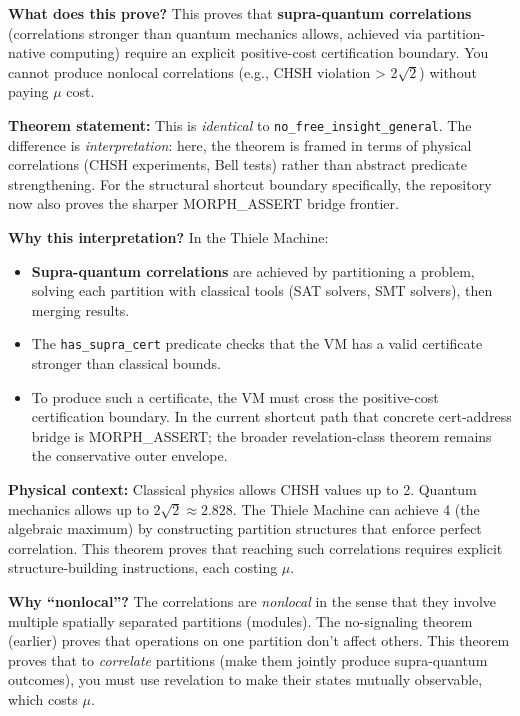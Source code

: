 \textbf{What does this prove?} This proves that \textbf{supra-quantum correlations} (correlations stronger than quantum mechanics allows, achieved via partition-native computing) require an explicit positive-cost certification boundary. You cannot produce nonlocal correlations (e.g., CHSH violation > 2$\sqrt{2}$) without paying $\mu$ cost.

\textbf{Theorem statement:} This is \textit{identical} to \texttt{no\_free\_insight\_general}. The difference is \textit{interpretation}: here, the theorem is framed in terms of physical correlations (CHSH experiments, Bell tests) rather than abstract predicate strengthening. For the structural shortcut boundary specifically, the repository now also proves the sharper MORPH\_ASSERT bridge frontier.

\textbf{Why this interpretation?} In the Thiele Machine:
\begin{itemize}
    \item \textbf{Supra-quantum correlations} are achieved by partitioning a problem, solving each partition with classical tools (SAT solvers, SMT solvers), then merging results.
    \item The \texttt{has\_supra\_cert} predicate checks that the VM has a valid certificate stronger than classical bounds.
    \item To produce such a certificate, the VM must cross the positive-cost certification boundary. In the current shortcut path that concrete cert-address bridge is MORPH\_ASSERT; the broader revelation-class theorem remains the conservative outer envelope.
\end{itemize}

\textbf{Physical context:} Classical physics allows CHSH values up to 2. Quantum mechanics allows up to $2\sqrt{2} \approx 2.828$. The Thiele Machine can achieve 4 (the algebraic maximum) by constructing partition structures that enforce perfect correlation. This theorem proves that reaching such correlations requires explicit structure-building instructions, each costing $\mu$.

\textbf{Why ``nonlocal''?} The correlations are \textit{nonlocal} in the sense that they involve multiple spatially separated partitions (modules). The no-signaling theorem (earlier) proves that operations on one partition don't affect others. This theorem proves that to \textit{correlate} partitions (make them jointly produce supra-quantum outcomes), you must use revelation to make their states mutually observable, which costs $\mu$.

